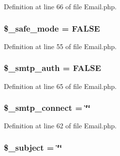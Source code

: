 Definition at line 66 of file Email.\-php.

\hypertarget{class_c_i___email_a9f2bbbf11ed324c1744f64d81242e8d5}{
\subsubsection[{\$\-\_\-safe\-\_\-mode}]{\setlength{\rightskip}{0pt plus 5cm}\$\-\_\-safe\-\_\-mode = F\-A\-L\-S\-E}}\label{class_c_i___email_a9f2bbbf11ed324c1744f64d81242e8d5}


Definition at line 55 of file Email.\-php.

\hypertarget{class_c_i___email_a9b977d5970ceedb6cba44032a9976459}{
\subsubsection[{\$\-\_\-smtp\-\_\-auth}]{\setlength{\rightskip}{0pt plus 5cm}\$\-\_\-smtp\-\_\-auth = F\-A\-L\-S\-E}}\label{class_c_i___email_a9b977d5970ceedb6cba44032a9976459}


Definition at line 65 of file Email.\-php.

\hypertarget{class_c_i___email_ab15af26ecd0970be1fb7609d06eec5ba}{
\subsubsection[{\$\-\_\-smtp\-\_\-connect}]{\setlength{\rightskip}{0pt plus 5cm}\${\bf \-\_\-smtp\-\_\-connect} = \char`\"{}\char`\"{}}}\label{class_c_i___email_ab15af26ecd0970be1fb7609d06eec5ba}


Definition at line 62 of file Email.\-php.

\hypertarget{class_c_i___email_a3a212566602bb9c1c34e7619390b1bb8}{
\subsubsection[{\$\-\_\-subject}]{\setlength{\rightskip}{0pt plus 5cm}\$\-\_\-subject = \char`\"{}\char`\"{}}}\label{class_c_i___email_a3a212566602bb9c1c34e7619390b1bb8}



